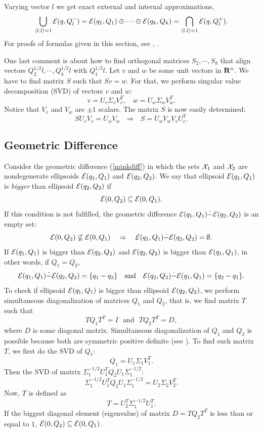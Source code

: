 \documentclass{report}
\newcommand{\EE}{{\cal E}}
\newcommand{\XX}{{\cal X}}
\begin{document}
Varying vector $l$ we get exact external and internal approximations,
\[ \bigcup_{\langle l,l\rangle=1} \EE(q,Q_l^-) =
\EE(q_1,Q_1)\oplus\cdots\oplus\EE(q_k,Q_k) =
\bigcap_{\langle l,l\rangle=1} \EE(q,Q_l^+) .\]
For proofs of formulas given in this section, see \cite{kurvalyi},
\cite{kurvar}.

One last comment is about how to find orthogonal matrices $S_2,\cdots,S_k$
that align vectors $Q_2^{1/2}l, \cdots, Q_k^{1/2}l$ with $Q_1^{1/2}l$.
Let $v$ and $w$ be some unit vectors in ${\bf R}^n$.
We have to find matrix $S$ such that $Sv=w$. For that,
we perform singular value decomposition (SVD) of vectors $v$ and $w$:
\begin{equation}
v = U_v\Sigma_vV_v^T, ~~~~ w = U_w\Sigma_wV_w^T . \label{valign1}
\end{equation}
Notice that $V_v$ and $V_w$ are $\pm1$ scalars.
The matrix $S$ is now easily determined:
\begin{equation}
S U_vV_v = U_wV_w ~~~ \Rightarrow ~~~ S = U_wV_wV_vU_v^T. \label{valign2}
\end{equation}


\subsection{Geometric Difference}
Consider the geometric difference (\ref{minkdiff}) in which the sets $\XX_1$ and
$\XX_2$ are nondegenerate ellipsoids $\EE(q_1,Q_1)$ and $\EE(q_2,Q_2)$.
We say that ellipsoid $\EE(q_1,Q_1)$ is {\it bigger} than ellipsoid
$\EE(q_2,Q_2)$ if
\[ \EE(0,Q_2) \subseteq \EE(0,Q_1). \]
If this condition is not fulfilled,  the geometric difference
$\EE(q_1,Q_1)\dot{-}\EE(q_2,Q_2)$ is an empty set:
\[ \EE(0,Q_2) \not\subseteq \EE(0,Q_1) ~~~ \Rightarrow ~~~
\EE(q_1,Q_1) \dot{-}\EE(q_2,Q_2) = \emptyset. \]
If $\EE(q_1,Q_1)$ is bigger than $\EE(q_2,Q_2)$ and
$\EE(q_2,Q_2)$ is bigger than $\EE(q_1,Q_1)$, in other words, if $Q_1=Q_2$,
\[ \EE(q_1,Q_1) \dot{-}\EE(q_2,Q_2) = \{q_1-q_2\} ~~~ \mbox{and} ~~~
\EE(q_2,Q_2) \dot{-}\EE(q_1,Q_1) = \{q_2-q_1\}. \]
To check if ellipsoid $\EE(q_1,Q_1)$ is bigger than ellipsoid $\EE(q_2,Q_2)$,
we perform simultaneous diagonalization of matrices $Q_1$ and $Q_2$, that is,
we find matrix $T$ such that
\[ TQ_1T^T = I ~~~ \mbox{and} ~~~ TQ_2T^T=D, \]
where $D$ is some diagonal matrix.
Simultaneous diagonalization of $Q_1$ and $Q_2$ is possible
because both are symmetric positive definite (see \cite{gant}).
To find such matrix $T$, we first do the SVD of $Q_1$:
\begin{equation}
Q_1 = U_1\Sigma_1V_1^T . \label{simdiag1}
\end{equation}
Then the SVD of matrix $\Sigma_1^{-1/2}U_1^TQ_2U_1\Sigma_1^{-1/2}$:
\begin{equation}
\Sigma_1^{-1/2}U_1^TQ_2U_1\Sigma_1^{-1/2} = U_2\Sigma_2V_2^T. \label{simdiag2}
\end{equation}
Now, $T$ is defined as
\begin{equation}
T = U_2^T \Sigma_1^{-1/2}U_1^T.  \label{simdiag3}
\end{equation}
If the biggest diagonal element (eigenvalue) of matrix $D=TQ_2T^T$ is less than
or equal to $1$,  $\EE(0,Q_2)\subseteq\EE(0,Q_1)$.
\end{document}
